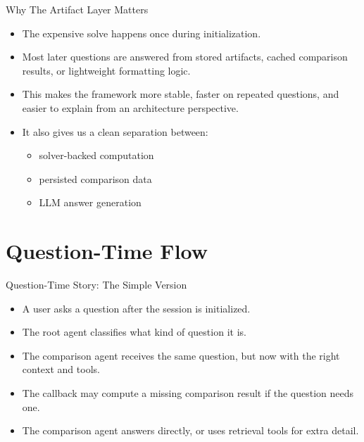 \documentclass[10pt]{beamer}
\begin{document}
\begin{frame}{Why The Artifact Layer Matters}
  \begin{itemize}
    \item The expensive solve happens once during initialization.
    \item Most later questions are answered from stored artifacts, cached comparison results, or lightweight formatting logic.
    \item This makes the framework more stable, faster on repeated questions, and easier to explain from an architecture perspective.
    \item It also gives us a clean separation between:
    \begin{itemize}
      \item solver-backed computation
      \item persisted comparison data
      \item LLM answer generation
    \end{itemize}
  \end{itemize}
\end{frame}

\section{Question-Time Flow}

\begin{frame}{Question-Time Story: The Simple Version}
  \begin{itemize}
    \item A user asks a question after the session is initialized.
    \item The root agent classifies what kind of question it is.
    \item The comparison agent receives the same question, but now with the right context and tools.
    \item The callback may compute a missing comparison result if the question needs one.
    \item The comparison agent answers directly, or uses retrieval tools for extra detail.
  \end{itemize}
\end{frame}
\end{document}
